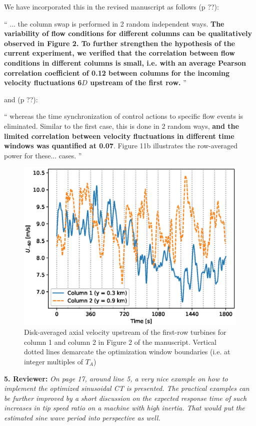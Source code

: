 \documentclass[]{article}
\begin{document}
We have incorporated this in the revised manuscript as follows (p ??): 

``
... the column swap is performed in 2 random independent ways. \textbf{The variability of flow conditions for different columns can be qualitatively observed in Figure 2. To further strengthen the hypothesis of the current experiment, we verified that the  correlation between flow conditions in different columns is small, i.e. with an average Pearson correlation coefficient of 0.12 between columns for the incoming velocity fluctuations 6$D$ upstream of the first row.}
''

and (p ??):

``
whereas the time synchronization of control actions to specific flow events is eliminated. Similar to the first case, this is done in 2 random ways, \textbf{and the limited correlation between velocity fluctuations in different time windows was quantified at 0.07}. Figure 11b illustrates the row-averaged power for these...
cases.
''

\begin{figure}
	\includegraphics[width=\textwidth]{upstream_vel.eps}
	\caption{Disk-averaged axial velocity upstream of the first-row turbines for column 1 and column 2 in Figure 2 of the manuscript. Vertical dotted lines demarcate the optimization window boundaries (i.e. at integer multiples of $T_A$) \label{fig:upstream_vel}}
\end{figure}

\dotfill

\textbf{5. Reviewer: } \textit{On page 17, around line 5, a very nice example on how to implement the optimized
	sinusoidal CT is presented. The practical examples can be further improved by a
	short discussion on the expected response time of such increases in tip speed ratio
	on a machine with high inertia. That would put the estimated sine wave period into
	perspective as well.}
\end{document}
